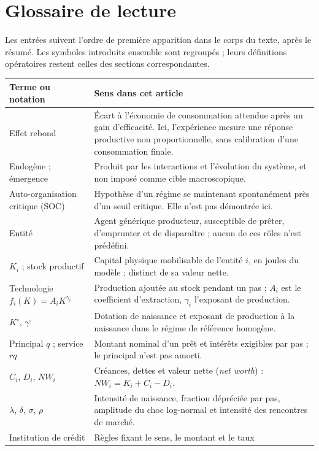 \section{Glossaire de lecture}\label{sec:glossaire}
Les entrées suivent l'ordre de première apparition dans le corps du
texte, après le résumé. Les symboles introduits ensemble sont regroupés ;
leurs définitions opératoires restent celles des sections correspondantes.

\begin{small}
\begin{longtable}{@{}>{\raggedright\arraybackslash}p{.27\linewidth}p{.66\linewidth}@{}}
\toprule Terme ou notation & Sens dans cet article \\
\midrule\endhead
Effet rebond & Écart à l'économie de consommation attendue après un gain
d'efficacité. Ici, l'expérience mesure une réponse productive non
proportionnelle, sans calibration d'une consommation finale. \\
Endogène ; émergence & Produit par les interactions et l'évolution du
système, et non imposé comme cible macroscopique. \\
Auto-organisation critique (SOC) & Hypothèse d'un régime se maintenant
spontanément près d'un seuil critique. Elle n'est pas démontrée ici. \\
Entité & Agent générique producteur, susceptible de prêter, d'emprunter
et de disparaître ; aucun de ces rôles n'est prédéfini. \\
$K_i$ ; stock productif & Capital physique mobilisable de l'entité $i$,
en joules du modèle ; distinct de sa valeur nette. \\
Technologie $f_i(K)=A_iK^{\gamma_i}$ & Production ajoutée au stock
pendant un pas ; $A_i$ est le coefficient d'extraction, $\gamma_i$
l'exposant de production. \\
$K^\circ$, $\gamma^\circ$ & Dotation de naissance et exposant de
production à la naissance dans le régime de référence homogène. \\
Principal $q$ ; service $rq$ & Montant nominal d'un prêt et intérêts
exigibles par pas ; le principal n'est pas amorti. \\
$C_i$, $D_i$, $NW_i$ & Créances, dettes et valeur nette
(\emph{net worth}) : $NW_i=K_i+C_i-D_i$. \\
$\lambda$, $\delta$, $\sigma$, $\rho$ & Intensité de naissance,
fraction dépréciée par pas, amplitude du choc log-normal et intensité
des rencontres de marché. \\
Institution de crédit & Règles fixant le sens, le montant et le taux

\end{longtable}
\end{small}
